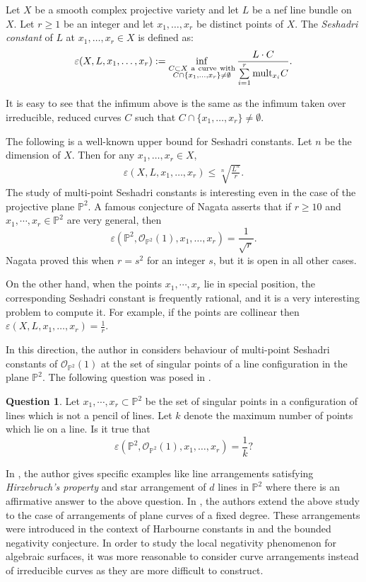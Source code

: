 \documentclass[12pt,reqno]{amsart}
\theoremstyle{plain}
\numberwithin{equation}{section}
\theoremstyle{definition}
\newtheorem{question}[theorem]{Question}
\begin{document}
	Let $X$ be a smooth complex projective variety and let $L$ be a nef line bundle on
	$X$. Let $r \ge 1$ be an integer and let $x_1,\ldots,x_r$ be distinct
	points of $X$.
	The {\it Seshadri constant} of $L$ at $x_1,\ldots,x_r \in X$ is defined as: 
	$$\varepsilon(X,L,x_1,\ldots,x_r):=  \inf\limits_{\substack{C \subset
			X{\rm ~a~ curve~ with} \\C \cap \{x_1,\ldots,x_r\}
			\ne \emptyset}} \frac{L\cdot C}{\sum\limits_{i=1}^r {\rm
			mult}_{x_i}C}.$$ 
	
	It is easy to see that the infimum above is the same as the infimum taken over
	irreducible, reduced curves $C$ such that $C \cap \{x_1,\ldots,x_r\}
	\ne \emptyset$.
	
	The following is a  well-known upper bound for Seshadri
	constants. 
	Let $n$ be the dimension of $X$. Then for
	any $x_1,\ldots,x_r \in X$, 
	\begin{eqnarray*}\label{wellknown}
		\varepsilon(X,L,x_1,\ldots,x_r) \le
		\sqrt[n]{\frac{L^n}{r}}.
	\end{eqnarray*}
	The study of multi-point Seshadri constants is interesting even in the case of the projective plane $\mathbb{P}^2.$ A famous conjecture of Nagata asserts that if $r \geq 10$ and $x_1,\cdots, x_r \in \mathbb{P}^2 $ are very general, then 
	$$\varepsilon(\mathbb{P}^2,\mathcal{O}_{\mathbb{P}^2}(1),x_1,\ldots,x_r)= \frac{1}{\sqrt{r}}.$$ 
	Nagata \cite{Nag} proved this when $r=s^2$ for an integer $s$, but it is open in all other cases. 
	
	On the other hand, when the points $x_1, \cdots, x_r$ lie in special position, the corresponding  Seshadri constant is frequently rational, and it is a very interesting problem to compute it. For example, if the points are collinear then 
	$\varepsilon(X,L,x_1,\ldots,x_r) = \frac{1}{r}$. 
	
	In this direction, the author in \cite{Pok} considers behaviour of multi-point Seshadri constants  
	of $\mathcal{O}_{\mathbb{P}^2}(1)$ at the 
	set of singular points  of a line configuration in the plane $\mathbb{P}^2.$  The following 
	question was posed in \cite{Pok}. 
	
		\begin{question}\label{qn1}
		Let $x_1, \cdots, x_r \subset \mathbb{P}^2$ be the set of singular points in a configuration of lines  which is not a pencil of lines. Let $k$ denote the maximum number of points which lie on a line. Is it true that 
		$$\varepsilon(\mathbb{P}^2,\mathcal{O}_{\mathbb{P}^2}(1),x_1,\ldots,x_r)= \frac{1}{k} ? $$
	\end{question}
	In \cite{Pok}, the author gives specific examples like line arrangements satisfying \textit{Hirzebruch's property} and star arrangement of $d$ lines in $\mathbb{P}^2$ where there is an affirmative answer to the above question. 
	In \cite{JP}, the authors extend the above study to the case of arrangements of plane curves of a fixed degree. These arrangements were introduced in the context of Harbourne constants in \cite{PRS} and the bounded negativity conjecture. In order to study the  local negativity phenomenon for algebraic surfaces, it was more reasonable to consider curve arrangements instead of irreducible curves as they are more difficult to construct.  
	
\end{document}
